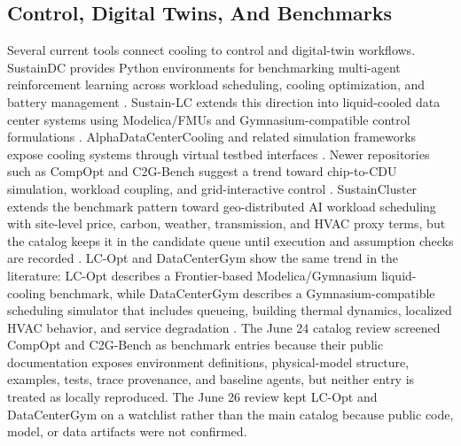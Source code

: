 \documentclass[11pt]{article}
\begin{document}
\subsection{Control, Digital Twins, And Benchmarks}

Several current tools connect cooling to control and digital-twin workflows. SustainDC provides Python environments for benchmarking multi-agent reinforcement learning across workload scheduling, cooling optimization, and battery management \cite{HPEDCRL2026}. Sustain-LC extends this direction into liquid-cooled data center systems using Modelica/FMUs and Gymnasium-compatible control formulations \cite{HPESustainLC2026}. AlphaDataCenterCooling and related simulation frameworks expose cooling systems through virtual testbed interfaces \cite{AlphaDataCenterCooling2026}. Newer repositories such as CompOpt and C2G-Bench suggest a trend toward chip-to-CDU simulation, workload coupling, and grid-interactive control \cite{HPECompOpt2026,HPEC2GBench2026}. SustainCluster extends the benchmark pattern toward geo-distributed AI workload scheduling with site-level price, carbon, weather, transmission, and HVAC proxy terms, but the catalog keeps it in the candidate queue until execution and assumption checks are recorded \cite{HPESustainCluster2026}. LC-Opt and DataCenterGym show the same trend in the literature: LC-Opt describes a Frontier-based Modelica/Gymnasium liquid-cooling benchmark, while DataCenterGym describes a Gymnasium-compatible scheduling simulator that includes queueing, building thermal dynamics, localized HVAC behavior, and service degradation \cite{NaugLCOpt2025,PathakDataCenterGym2026}. The June 24 catalog review screened CompOpt and C2G-Bench as benchmark entries because their public documentation exposes environment definitions, physical-model structure, examples, tests, trace provenance, and baseline agents, but neither entry is treated as locally reproduced. The June 26 review kept LC-Opt and DataCenterGym on a watchlist rather than the main catalog because public code, model, or data artifacts were not confirmed.
\end{document}
